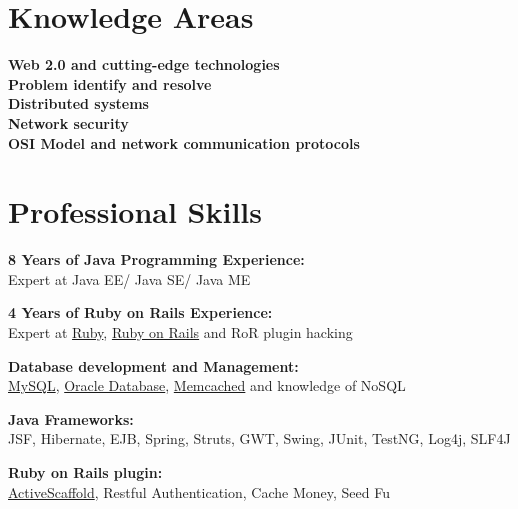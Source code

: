 
\section{Knowledge Areas}
{\textbf{Web 2.0 and cutting-edge technologies}}\\
{\textbf{Problem identify and resolve}}\\
{\textbf{Distributed systems}}\\ 
{\textbf{Network security}}\\ 
{\textbf{OSI Model and network communication protocols}}\\


\section{Professional Skills} 
%
{\textbf{8 Years of Java Programming Experience:}}\\
Expert at Java EE/ Java SE/ Java ME

\blankline

{\textbf{4 Years of Ruby \nolinebreak on \nolinebreak Rails Experience:}}\\
Expert at 
\href{http://www.ruby-lang.org/en/}{Ruby}, 
\href{http://rubyonrails.org/}{Ruby on Rails} and RoR plugin hacking

\blankline

{\textbf{Database development and Management:}}\\
\href{http://www.mysql.com/}{MySQL}, 
\href{http://www.oracle.com/us/products/database/index.html}{Oracle Database}, 
\href{http://memcached.org/}{Memcached} and knowledge of NoSQL

\blankline

{\textbf{Java Frameworks:}}\\
JSF, Hibernate, EJB, Spring, Struts, GWT, Swing, JUnit, TestNG, Log4j, SLF4J

\blankline

{\textbf{Ruby \nolinebreak on \nolinebreak Rails plugin:}}\\
\href{http://activescaffold.com/}{ActiveScaffold},
Restful Authentication,
Cache Money,
Seed Fu

